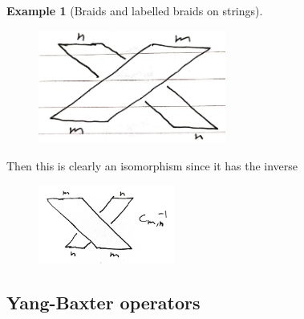 \documentclass[reqno]{amsart}
\theoremstyle{definition}
\newtheorem{example}[theorem]{Example}
\theoremstyle{remark}
\begin{document}
\begin{example}[Braids and labelled braids on strings]
       \begin{figure}[H]
           \centering
           \includegraphics[width=0.55\textwidth]{braiding-on-braid-groupoid-2.jpeg}
           \label{fig:braiding-on-braid-groupoid-jpeg}
       \end{figure}
       Then this is clearly an isomorphism since it has
       the inverse

       \begin{figure}[H]
           \centering
           \includegraphics[width=0.4\textwidth]{inverse-braiding.jpeg}
           \label{fig:inverse-braiding-jpeg}
       \end{figure}


   \end{example}


\subsection{Yang-Baxter operators}
\end{document}
